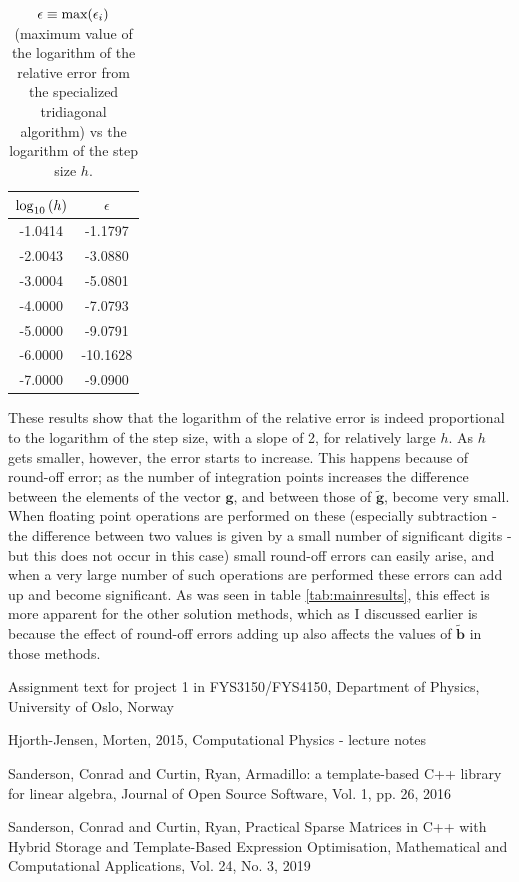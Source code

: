 \documentclass[a4paper,english]{article}
\renewcommand\vec{\mathbf}
\let\originalleft\left
\let\originalright\right
\renewcommand{\left}{\mathopen{}\mathclose\bgroup\originalleft}
\renewcommand{\right}{\aftergroup\egroup\originalright}
\begin{document}
\begin{table}[!ht]
  \centering
  \begin{tabular}{c c} \toprule
    $\log_{10}{\left(h\right)}$ & $\epsilon$ \\\midrule
    -1.0414 & -1.1797 \\
    -2.0043 & -3.0880 \\
    -3.0004 & -5.0801 \\
    -4.0000 & -7.0793 \\
    -5.0000 & -9.0791 \\
    -6.0000 & -10.1628 \\
    -7.0000 & -9.0900\\\bottomrule
  \end{tabular}
  \caption{$\epsilon \equiv \text{max}\left(\epsilon_i\right)$ (maximum value of the logarithm of the relative error from the specialized tridiagonal algorithm) vs the logarithm of the step size $h$.}
  \label{tab:error_tab}
\end{table}
These results show that the logarithm of the relative error is indeed proportional to the logarithm of the step size, with a slope of 2, for relatively large $h$. As $h$ gets smaller, however, the error starts to increase. This happens because of round-off error; as the number of integration points increases the difference between the elements of the vector $\vec{g}$, and between those of $\tilde{\vec{g}}$, become very small. When floating point operations are performed on these (especially subtraction - the difference between two values is given by a small number of significant digits - but this does not occur in this case) small round-off errors can easily arise, and when a very large number of such operations are performed these errors can add up and become significant. As was seen in table \ref{tab:mainresults}, this effect is more apparent for the other solution methods, which as I discussed earlier is because the effect of round-off errors adding up also affects the values of $\tilde{\vec{b}}$ in those methods.

\begin{thebibliography}{}
    Assignment text for project 1 in FYS3150/FYS4150,
    Department of Physics, University of Oslo, Norway

    Hjorth-Jensen, Morten,
    2015,
    Computational Physics - lecture notes

    Sanderson, Conrad and Curtin, Ryan,
    Armadillo: a template-based C++ library for linear algebra,
    Journal of Open Source Software, Vol. 1, pp. 26, 2016

    Sanderson, Conrad and Curtin, Ryan,
    Practical Sparse Matrices in C++ with Hybrid Storage and Template-Based Expression Optimisation,
    Mathematical and Computational Applications, Vol. 24, No. 3, 2019
\end{thebibliography}
\end{document}
